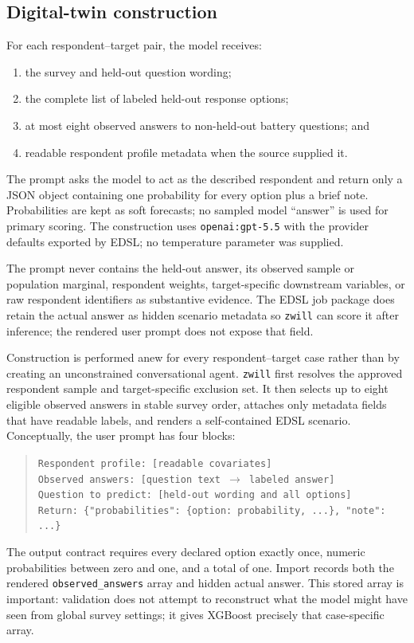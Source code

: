 \documentclass[11pt]{article}
\newcommand{\zwill}{\texttt{zwill}}
\begin{document}
\subsection{Digital-twin construction}
For each respondent--target pair, the model receives:
\begin{enumerate}[nosep]
  \item the survey and held-out question wording;
  \item the complete list of labeled held-out response options;
  \item at most eight observed answers to non-held-out battery questions; and
  \item readable respondent profile metadata when the source supplied it.
\end{enumerate}
The prompt asks the model to act as the described respondent and return only a
JSON object containing one probability for every option plus a brief note.
Probabilities are kept as soft forecasts; no sampled model ``answer'' is used
for primary scoring. The construction uses \texttt{openai:gpt-5.5} with the
provider defaults exported by EDSL; no temperature parameter was supplied.

The prompt never contains the held-out answer, its observed sample or
population marginal, respondent weights, target-specific downstream
variables, or raw respondent identifiers as substantive evidence. The EDSL job
package does retain the actual answer as hidden scenario metadata so
\zwill{} can score it after inference; the rendered user prompt does not
expose that field.

Construction is performed anew for every respondent--target case rather than
by creating an unconstrained conversational agent. \zwill{} first resolves the
approved respondent sample and target-specific exclusion set. It then selects
up to eight eligible observed answers in stable survey order, attaches only
metadata fields that have readable labels, and renders a self-contained EDSL
scenario. Conceptually, the user prompt has four blocks:
\begin{quote}\small
\texttt{Respondent profile: [readable covariates]}\\
\texttt{Observed answers: [question text $\rightarrow$ labeled answer]}\\
\texttt{Question to predict: [held-out wording and all options]}\\
\texttt{Return: \{"probabilities": \{option: probability, ...\}, "note": ...\}}
\end{quote}
The output contract requires every declared option exactly once, numeric
probabilities between zero and one, and a total of one. Import records both the
rendered \texttt{observed\_answers} array and hidden actual answer. This stored
array is important: validation does not attempt to reconstruct what the model
might have seen from global survey settings; it gives XGBoost precisely that
case-specific array.
\end{document}
